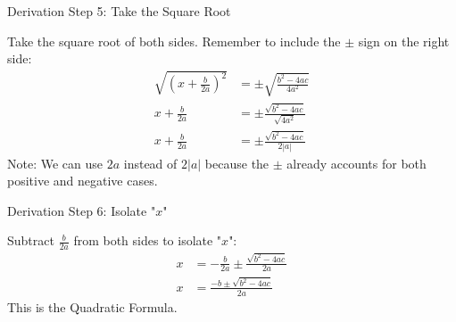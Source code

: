\documentclass[aspectratio=169]{beamer}
\begin{document}
\begin{frame}{Derivation Step 5: Take the Square Root}
    \begin{tcolorbox}[colback=lightgray,colframe=accent,title=Step 5]
        \footnotesize
        Take the square root of both sides. Remember to include the $\pm$ sign on the right side:
        \begin{align*}
            \sqrt{\left(x + \frac{b}{2a}\right)^2} &= \pm\sqrt{\frac{b^2 - 4ac}{4a^2}} \\
            x + \frac{b}{2a} &= \pm\frac{\sqrt{b^2 - 4ac}}{\sqrt{4a^2}} \\
            x + \frac{b}{2a} &= \pm\frac{\sqrt{b^2 - 4ac}}{2|a|}
        \end{align*}
        Note: We can use $2a$ instead of $2|a|$ because the $\pm$ already accounts for both positive and negative cases.
    \end{tcolorbox}
\end{frame}

\begin{frame}{Derivation Step 6: Isolate "$x$"}
    \begin{tcolorbox}[colback=lightgray,colframe=accent,title=Step 6]
        \footnotesize
        Subtract $\frac{b}{2a}$ from both sides to isolate "$x$":
        \begin{align*}
            x &= -\frac{b}{2a} \pm\frac{\sqrt{b^2 - 4ac}}{2a} \\
            x &= \frac{-b \pm \sqrt{b^2 - 4ac}}{2a}
        \end{align*}
        This is the Quadratic Formula.
    \end{tcolorbox}
\end{frame}
\end{document}
